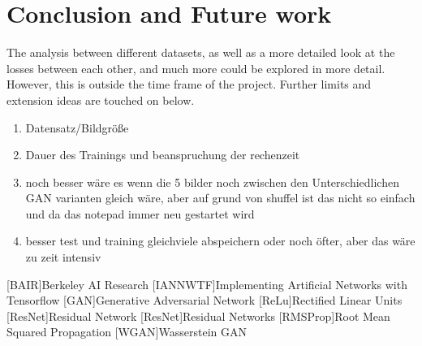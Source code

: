 \documentclass[fleqn,10pt]{SelfArx} %
\begin{document}
\section{Conclusion and Future work}
The analysis between different datasets, as well as a more detailed look at the losses between each other, and much more could be explored in more detail. However, this is outside the time frame of the project. Further limits and extension ideas are touched on below.


\begin{enumerate}[noitemsep] %
	\item Datensatz/Bildgröße
	\item Dauer des Trainings und beanspruchung der rechenzeit
	\item noch besser wäre es wenn die 5 bilder noch zwischen den Unterschiedlichen GAN varianten gleich wäre, aber auf grund von shuffel ist das nicht so einfach und da das notepad immer neu gestartet wird
	\item besser test und training gleichviele abspeichern oder noch öfter, aber das wäre zu zeit intensiv
\end{enumerate}






\begin{acronym}
[BAIR]{Berkeley AI Research}
[IANNWTF]{Implementing Artificial Networks with Tensorflow}
[GAN]{Generative Adversarial Network}
[ReLu]{Rectified Linear Units}
[ResNet]{Residual Network}
[ResNet]{Residual Networks}
[RMSProp]{Root Mean Squared Propagation}
[WGAN]{Wasserstein \ac{GAN}}
\end{acronym}

\end{document}
